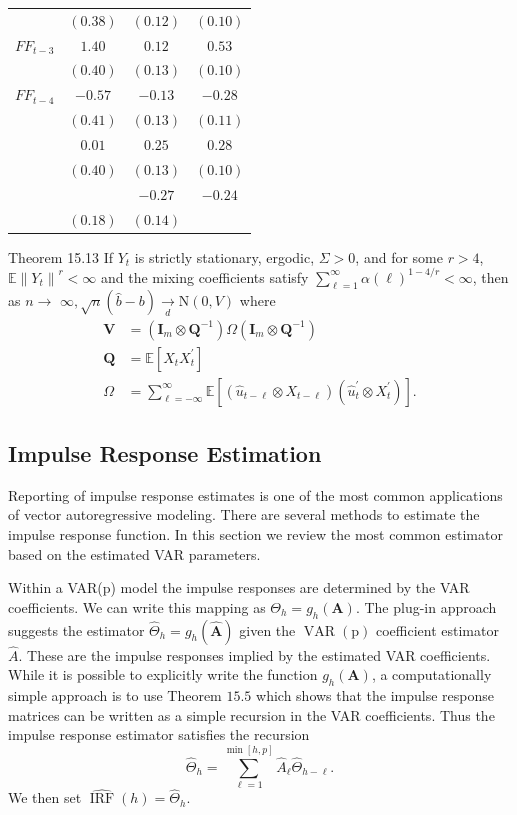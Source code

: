 \documentclass[10pt]{article}
\begin{document}
\begin{tabular}{lccc}
 & $(0.38)$ & $(0.12)$ & $(0.10)$ \\
$F F_{t-3}$ & $1.40$ & $0.12$ & $0.53$ \\
 & $(0.40)$ & $(0.13)$ & $(0.10)$ \\
$F F_{t-4}$ & $-0.57$ & $-0.13$ & $-0.28$ \\
 & $(0.41)$ & $(0.13)$ & $(0.11)$ \\
 & $0.01$ & $0.25$ & $0.28$ \\
 & $(0.40)$ & $(0.13)$ & $(0.10)$ \\
 &  & $-0.27$ & $-0.24$ \\
 & $(0.18)$ & $(0.14)$ &  \\
\hline
\end{tabular}

Theorem 15.13 If $Y_{t}$ is strictly stationary, ergodic, $\Sigma>0$, and for some $r>4$, $\mathbb{E}\left\|Y_{t}\right\|^{r}<\infty$ and the mixing coefficients satisfy $\sum_{\ell=1}^{\infty} \alpha(\ell)^{1-4 / r}<\infty$, then as $n \rightarrow$ $\infty, \sqrt{n}(\widehat{b}-b) \underset{d}{\longrightarrow} \mathrm{N}(0, V)$ where
$$
\begin{aligned}
\boldsymbol{V} &=\left(\boldsymbol{I}_{m} \otimes \boldsymbol{Q}^{-1}\right) \Omega\left(\boldsymbol{I}_{m} \otimes \boldsymbol{Q}^{-1}\right) \\
\boldsymbol{Q} &=\mathbb{E}\left[X_{t} X_{t}^{\prime}\right] \\
\Omega &=\sum_{\ell=-\infty}^{\infty} \mathbb{E}\left[\left(\widehat{u}_{t-\ell} \otimes X_{t-\ell}\right)\left(\widehat{u}_{t}^{\prime} \otimes X_{t}^{\prime}\right)\right] .
\end{aligned}
$$

\subsection{Impulse Response Estimation}
Reporting of impulse response estimates is one of the most common applications of vector autoregressive modeling. There are several methods to estimate the impulse response function. In this section we review the most common estimator based on the estimated VAR parameters.

Within a VAR(p) model the impulse responses are determined by the VAR coefficients. We can write this mapping as $\Theta_{h}=g_{h}(\boldsymbol{A})$. The plug-in approach suggests the estimator $\widehat{\Theta}_{h}=g_{h}(\widehat{\boldsymbol{A}})$ given the $\operatorname{VAR}(\mathrm{p})$ coefficient estimator $\widehat{A}$. These are the impulse responses implied by the estimated VAR coefficients. While it is possible to explicitly write the function $g_{h}(\boldsymbol{A})$, a computationally simple approach is to use Theorem $15.5$ which shows that the impulse response matrices can be written as a simple recursion in the VAR coefficients. Thus the impulse response estimator satisfies the recursion
$$
\widehat{\Theta}_{h}=\sum_{\ell=1}^{\min [h, p]} \widehat{A}_{\ell} \widehat{\Theta}_{h-\ell} .
$$
We then set $\widehat{\operatorname{IRF}}(h)=\widehat{\Theta}_{h}$.
\end{document}
